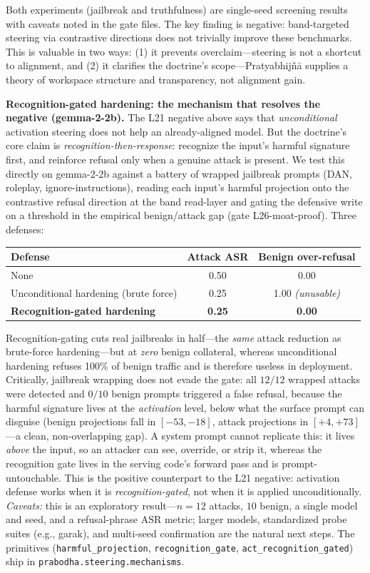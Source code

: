 Both experiments (jailbreak and truthfulness) are single-seed screening results with caveats noted in the
gate files. The key finding is negative: band-targeted steering via contrastive directions does not trivially
improve these benchmarks. This is valuable in two ways: (1) it prevents overclaim---steering is not a shortcut
to alignment, and (2) it clarifies the doctrine's scope---Pratyabhij\~n\=a supplies a theory of workspace structure
and transparency, not alignment gain.

\textbf{Recognition-gated hardening: the mechanism that resolves the negative (gemma-2-2b).}
The L21 negative above says that \emph{unconditional} activation steering does not help an already-aligned
model. But the doctrine's core claim is \emph{recognition-then-response}: recognize the input's harmful
signature first, and reinforce refusal only when a genuine attack is present. We test this directly on
gemma-2-2b against a battery of wrapped jailbreak prompts (DAN, roleplay, ignore-instructions), reading each
input's harmful projection onto the contrastive refusal direction at the band read-layer and gating the
defensive write on a threshold in the empirical benign/attack gap (gate L26-moat-proof). Three defenses:

\begin{center}
\begin{tabular}{lcc}
\toprule
Defense & Attack ASR & Benign over-refusal \\
\midrule
None & 0.50 & 0.00 \\
Unconditional hardening (brute force) & 0.25 & 1.00 \emph{(unusable)} \\
\textbf{Recognition-gated hardening} & \textbf{0.25} & \textbf{0.00} \\
\bottomrule
\end{tabular}
\end{center}

Recognition-gating cuts real jailbreaks in half---the \emph{same} attack reduction as brute-force
hardening---but at \emph{zero} benign collateral, whereas unconditional hardening refuses 100\% of benign
traffic and is therefore useless in deployment. Critically, jailbreak wrapping does not evade the gate: all
$12/12$ wrapped attacks were detected and $0/10$ benign prompts triggered a false refusal, because the
harmful signature lives at the \emph{activation} level, below what the surface prompt can disguise (benign
projections fall in $[-53,-18]$, attack projections in $[+4,+73]$---a clean, non-overlapping gap). A system
prompt cannot replicate this: it lives \emph{above} the input, so an attacker can see, override, or strip it,
whereas the recognition gate lives in the serving code's forward pass and is prompt-untouchable. This is the
positive counterpart to the L21 negative: activation defense works when it is \emph{recognition-gated}, not
when it is applied unconditionally. \emph{Caveats:} this is an exploratory result---$n=12$ attacks, $10$
benign, a single model and seed, and a refusal-phrase ASR metric; larger models, standardized probe suites
(e.g., garak), and multi-seed confirmation are the natural next steps. The primitives
(\texttt{harmful\_projection}, \texttt{recognition\_gate}, \texttt{act\_recognition\_gated}) ship in
\texttt{prabodha.steering.mechanisms}.

